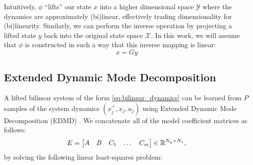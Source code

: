 \documentclass{article}
\begin{document}
Intuitively, $\phi$ ``lifts'' our state $x$ into a higher dimensional space $\mathcal{Y}$
where the dynamics are approximately (bi)linear, effectively trading dimensionality for
(bi)linearity. Similarly, we can perform the inverse operation by projecting a lifted state
$y$ back into the original state space $\mathcal{X}$. In this work, we will assume that
$\phi$ is constructed in such a way that this inverse mapping is linear:
\begin{equation}
	x = G y
\end{equation}


\subsection{Extended Dynamic Mode Decomposition} \label{sec:edmd}

A lifted bilinear system of the form \eqref{eq:bilinear_dynamics} can be learned from $P$
samples of the system dynamics $(x_j^+,x_j,u_j)$ using Extended Dynamic Mode Decomposition
(EDMD) \cite{Williams2015,Folkestad2021}. We concatenate all of the model coefficient
matrices as follows:
\begin{equation} \label{eq:E_matrixdef}
  E = \begin{bmatrix} A & B & C_1 & \dots & C_m \end{bmatrix} \in \mathbb{R}^{N_y \times N_z},
\end{equation}
by solving the following linear least-squares problem:
\end{document}
